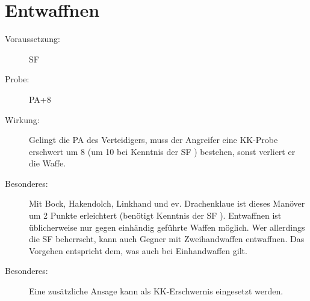 \section{Entwaffnen}
\label{bPA.entwaffnen}
\begin{description}
    \item[Voraussetzung:]
        SF 
    \item[Probe:]
        PA+8
    \item[Wirkung:]
        Gelingt die PA des Verteidigers, muss der Angreifer eine KK-Probe erschwert um 8 (um 10 bei Kenntnis der SF ) bestehen, sonst verliert er die Waffe.
    \item[Besonderes:]
        Mit Bock, Hakendolch, Linkhand und ev. Drachenklaue ist dieses Manöver um 2 Punkte erleichtert (benötigt Kenntnis der SF ).
        Entwaffnen ist üblicherweise nur gegen einhändig geführte Waffen möglich.
        Wer allerdings die SF  beherrscht, kann auch Gegner mit Zweihandwaffen entwaffnen.
        Das Vorgehen entspricht dem, was auch bei Einhandwaffen gilt.
    \item[Besonderes:]
        Eine zusätzliche Ansage kann als KK-Erschwernis eingesetzt werden.
\end{description}
